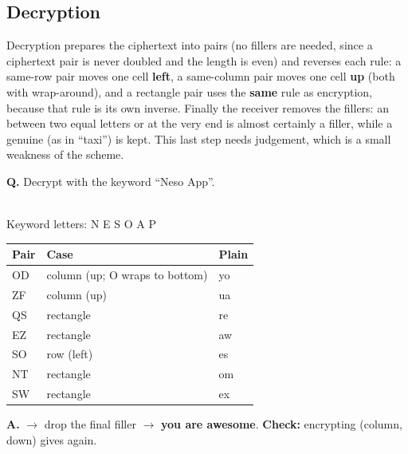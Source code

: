 \subsection{Decryption}
Decryption prepares the ciphertext into pairs (no fillers are needed, since a ciphertext pair is never doubled and the length is even) and reverses each rule: a same-row pair moves one cell \textbf{left}, a same-column pair moves one cell \textbf{up} (both with wrap-around), and a rectangle pair uses the \textbf{same} rule as encryption, because that rule is its own inverse. Finally the receiver removes the fillers: an  between two equal letters or at the very end is almost certainly a filler, while a genuine  (as in ``taxi'') is kept. This last step needs judgement, which is a small weakness of the scheme.

\begin{worked}
\textbf{Q.} Decrypt  with the keyword ``Neso App''.

\begin{minipage}[c]{0.36\textwidth}
\centering
{}\\[2pt]
{\footnotesize Keyword letters: N E S O A P}
\end{minipage}\hfill
\begin{minipage}[c]{0.6\textwidth}
\small
\begin{tabular}{@{}lll@{}}
\toprule
Pair & Case & Plain\\
\midrule
OD & column (up; O wraps to bottom) & yo\\
ZF & column (up) & ua\\
QS & rectangle & re\\
EZ & rectangle & aw\\
SO & row (left) & es\\
NT & rectangle & om\\
SW & rectangle & ex\\
\bottomrule
\end{tabular}
\end{minipage}

\medskip
\textbf{A.}  $\to$ drop the final filler $\to$ \textbf{you are awesome}. \textbf{Check:} encrypting  (column, down) gives  again.
\end{worked}

